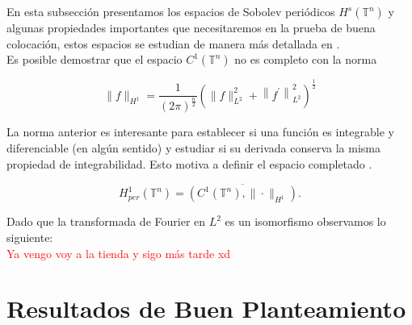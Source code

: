 \documentclass[12pt]{article}
\newcommand\T{\mathbb{T}}
\begin{document}
En esta subsección presentamos los espacios de Sobolev periódicos $H^s(\T^n)$ y algunas propiedades importantes que necesitaremos en la prueba de buena colocación, estos espacios se estudian de manera más detallada  en \cite{ioriojunior2001equacoes}.\\

Es posible demostrar que el espacio $C^1(\T^n)$ no es completo con la norma

$$
\|f\|_{H^1}=\frac{1}{(2 \pi)^{\frac{n}{2}}}\left(\|f\|_{L^2}^2+\left\|f^{\prime}\right\|_{L^2}^2\right)^{\frac{1}{2}}
$$


La norma anterior es interesante para establecer si una función es integrable y diferenciable (en algún sentido) y estudiar si su derivada conserva la misma propiedad de integrabilidad. Esto motiva a definir el espacio completado \cite{ogrianoc}.

$$
H_{p e r}^1(\T^n)=\overline{\left(C^1(\T^n),\|\cdot\|_{H^1}\right)}.
$$

Dado que la transformada de Fourier en $L^2$ es un isomorfismo observamos lo siguiente:\\

\textcolor{red}{Ya vengo voy a la tienda y sigo más tarde xd}

\section{Resultados de Buen Planteamiento}

\newpage



\nocite{*}
\end{document}
